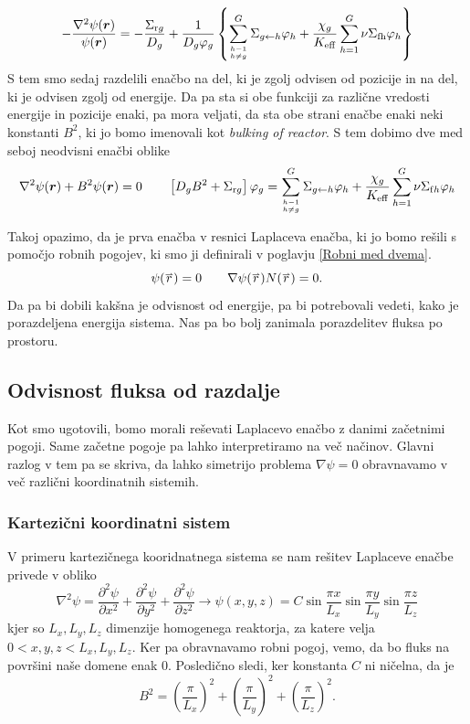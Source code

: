 \documentclass[slovene,11pt,a4paper]{article}
\renewcommand{\vec}[1]{\overset{\smash{\hbox{\raise -0.42ex\hbox{$\scriptscriptstyle\rightharpoonup$}}}}{#1}}
\begin{document}
\begin{equation}
-\frac{\nabla^{2} \psi(\boldsymbol{r})}{\psi(\boldsymbol{r})}=-\frac{\Sigma_{\mathrm{r} g}}{D_{g}}+\frac{1}{D_{g} \varphi_{g}}\left\{\sum_{h-1 \atop h \neq g}^{G} \Sigma_{g \leftarrow h} \varphi_{h}+\frac{\chi_{g}}{K_{\mathrm{eff}}} \sum_{h=1}^{G} \nu \Sigma_{\mathrm{fh}} \varphi_{h}\right\}
\end{equation}
S tem smo sedaj razdelili enačbo na del, ki je zgolj odvisen od pozicije in na del, ki je odvisen zgolj od energije. Da pa sta si obe funkciji za različne vredosti energije in pozicije enaki, pa mora veljati, da sta obe strani enačbe enaki neki konstanti $B^2$, ki jo bomo imenovali kot \textit{bulking of reactor}. S tem dobimo dve med seboj neodvisni enačbi oblike 
\begin{equation}
    \nabla^{2} \psi(\boldsymbol{r})+B^{2} \psi(\boldsymbol{r})=0 \qquad \left[D_{g} B^{2}+\Sigma_{\mathrm{r} g}\right] \varphi_{g}=\sum_{h-1 \atop h \neq g}^{G} \Sigma_{g \leftarrow h} \varphi_{h}+\frac{\chi_{g}}{K_{\mathrm{eff}}} \sum_{h=1}^{G} \nu \Sigma_{\mathrm{f} h} \varphi_{h}
\end{equation}

Takoj opazimo, da je prva enačba v resnici Laplaceva enačba, ki jo bomo rešili s pomočjo robnih pogojev, ki smo ji definirali v poglavju \ref{Robni med dvema}.
\begin{equation}
    \psi(\vec{r})=0 \qquad \nabla\psi(\vec{r})N(\vec{r})=0.
\end{equation}
Da pa bi dobili kakšna je odvisnost od energije, pa bi potrebovali vedeti, kako je porazdeljena energija sistema. Nas pa bo bolj zanimala porazdelitev fluksa po prostoru.
\subsection{Odvisnost fluksa od razdalje}
Kot smo ugotovili, bomo morali reševati Laplacevo enačbo z danimi začetnimi pogoji. Same začetne pogoje pa lahko interpretiramo na več načinov. Glavni razlog v tem pa se skriva, da lahko simetrijo problema $\nabla \psi=0$ obravnavamo v več različni koordinatnih sistemih. 
\subsubsection{Kartezični koordinatni sistem}
V primeru kartezičnega kooridnatnega sistema se nam rešitev Laplaceve enačbe privede v obliko
\begin{equation}
    \nabla^{2} \psi=\frac{\partial^{2} \psi}{\partial x^{2}}+\frac{\partial^{2} \psi}{\partial y^{2}}+\frac{\partial^{2} \psi}{\partial z^{2}} \rightarrow \psi(x, y, z)=C \sin \frac{\pi x}{L_{x}} \sin \frac{\pi y}{L_{y}} \sin \frac{\pi z}{L_{z}}
\end{equation}
kjer so $L_x, L_y, L_z$ dimenzije homogenega reaktorja, za katere velja $0<x,y,z<L_x,L_y,L_z$. Ker pa obravnavamo robni pogoj, vemo, da bo fluks na površini naše domene enak 0. Posledično sledi, ker konstanta $C$ ni ničelna, da je
\begin{equation}
B^{2}=\left(\frac{\pi}{L_{x}}\right)^{2}+\left(\frac{\pi}{L_{y}}\right)^{2}+\left(\frac{\pi}{L_{z}}\right)^{2}.
\end{equation}
\end{document}

